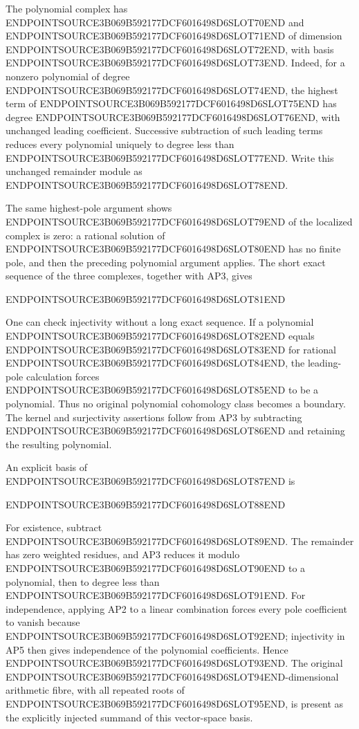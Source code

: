The polynomial complex has ENDPOINTSOURCE3B069B592177DCF6016498D6SLOT70END and ENDPOINTSOURCE3B069B592177DCF6016498D6SLOT71END of dimension ENDPOINTSOURCE3B069B592177DCF6016498D6SLOT72END, with basis ENDPOINTSOURCE3B069B592177DCF6016498D6SLOT73END. Indeed, for a nonzero polynomial of degree ENDPOINTSOURCE3B069B592177DCF6016498D6SLOT74END, the highest term of ENDPOINTSOURCE3B069B592177DCF6016498D6SLOT75END has degree ENDPOINTSOURCE3B069B592177DCF6016498D6SLOT76END, with unchanged leading coefficient. Successive subtraction of such leading terms reduces every polynomial uniquely to degree less than ENDPOINTSOURCE3B069B592177DCF6016498D6SLOT77END. Write this unchanged remainder module as ENDPOINTSOURCE3B069B592177DCF6016498D6SLOT78END.

The same highest-pole argument shows ENDPOINTSOURCE3B069B592177DCF6016498D6SLOT79END of the localized complex is zero: a rational solution of ENDPOINTSOURCE3B069B592177DCF6016498D6SLOT80END has no finite pole, and then the preceding polynomial argument applies. The short exact sequence of the three complexes, together with AP3, gives

ENDPOINTSOURCE3B069B592177DCF6016498D6SLOT81END

One can check injectivity without a long exact sequence. If a polynomial ENDPOINTSOURCE3B069B592177DCF6016498D6SLOT82END equals ENDPOINTSOURCE3B069B592177DCF6016498D6SLOT83END for rational ENDPOINTSOURCE3B069B592177DCF6016498D6SLOT84END, the leading-pole calculation forces ENDPOINTSOURCE3B069B592177DCF6016498D6SLOT85END to be a polynomial. Thus no original polynomial cohomology class becomes a boundary. The kernel and surjectivity assertions follow from AP3 by subtracting ENDPOINTSOURCE3B069B592177DCF6016498D6SLOT86END and retaining the resulting polynomial.

An explicit basis of ENDPOINTSOURCE3B069B592177DCF6016498D6SLOT87END is

ENDPOINTSOURCE3B069B592177DCF6016498D6SLOT88END

For existence, subtract ENDPOINTSOURCE3B069B592177DCF6016498D6SLOT89END. The remainder has zero weighted residues, and AP3 reduces it modulo ENDPOINTSOURCE3B069B592177DCF6016498D6SLOT90END to a polynomial, then to degree less than ENDPOINTSOURCE3B069B592177DCF6016498D6SLOT91END. For independence, applying AP2 to a linear combination forces every pole coefficient to vanish because ENDPOINTSOURCE3B069B592177DCF6016498D6SLOT92END; injectivity in AP5 then gives independence of the polynomial coefficients. Hence ENDPOINTSOURCE3B069B592177DCF6016498D6SLOT93END. The original ENDPOINTSOURCE3B069B592177DCF6016498D6SLOT94END-dimensional arithmetic fibre, with all repeated roots of ENDPOINTSOURCE3B069B592177DCF6016498D6SLOT95END, is present as the explicitly injected summand of this vector-space basis.

